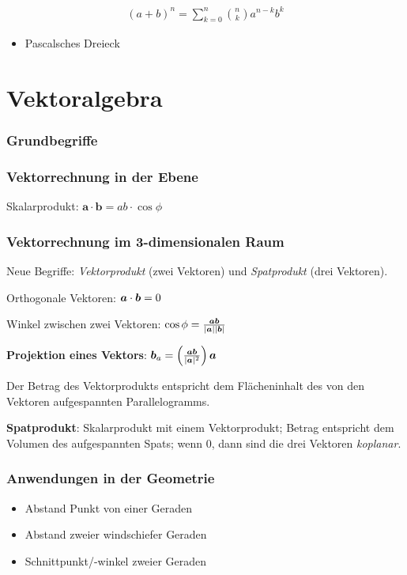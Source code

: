 \documentclass[12pt,a4paper]{article}
\begin{document}
\begin{align*}
  (a + b)^n = \sum_{k=0}^n \binom{n}{k} a^{n-k} b^k
\end{align*}

\begin{itemize}
  \item Pascalsches Dreieck
\end{itemize}

\part{Vektoralgebra}

\section{Grundbegriffe}


\section{Vektorrechnung in der Ebene}
Skalarprodukt: \( \bm{a} \cdot \bm{b} = ab \cdot \cos \phi \)


\section{Vektorrechnung im 3-dimensionalen Raum}
Neue Begriffe: \emph{Vektorprodukt} (zwei Vektoren) und \emph{Spatprodukt} (drei Vektoren).

Orthogonale Vektoren: \( \bm{a} \cdot \bm{b} = 0 \)

Winkel zwischen zwei Vektoren: \( \cos \phi = \frac{\bm{a} \bm{b}}{|\bm{a}| |\bm{b}|} \)

\textbf{Projektion eines Vektors}: \( \bm{b}_a = \left(\frac{\bm{a} \bm{b}}{|\bm{a}|^2}\right) \bm{a} \)

Der Betrag des Vektorprodukts entspricht dem Flächeninhalt des von den Vektoren aufgespannten Parallelogramms.

\textbf{Spatprodukt}: Skalarprodukt mit einem Vektorprodukt; Betrag entspricht dem Volumen des
aufgespannten Spats; wenn 0, dann sind die drei Vektoren \emph{koplanar}.

\section{Anwendungen in der Geometrie}
\begin{itemize}
  \item Abstand Punkt von einer Geraden
  \item Abstand zweier windschiefer Geraden
  \item Schnittpunkt/-winkel zweier Geraden
\end{itemize}
\end{document}

